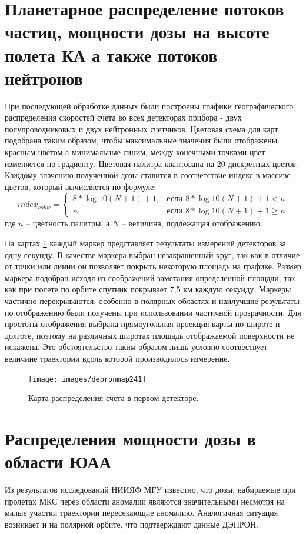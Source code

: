 \section{Планетарное распределение потоков частиц, мощности дозы на высоте полета КА а также потоков нейтронов} \label{sec:planetDose}
При последующей обработке данных были построены графики географического распределения скоростей счета во всех детекторах прибора - двух полупроводниковых и двух нейтронных счетчиков. Цветовая схема для карт подобрана таким образом, чтобы максимальные значения были отображены красным цветом а минимальные синим, между конечными точками цвет изменяется по градиенту. Цветовая палитра квантована на 20 дискретных цветов. Каждому значению полученной дозы ставится в соответствие индекс в массиве цветов, который вычисляется по формуле:
\begin{equation*}
index_{color} = \begin{cases}
	8*\log{10}(N + 1)+1,  & \text{если } 8*\log{10}(N + 1) +1 < n \\
	n,  & \text{если } 8*\log{10}(N + 1) +1 \ge n
	\end{cases}
\end{equation*}
		где $ n $ -- цветность палитры, а $ N $ -- величина, подлежащая отображению.
						
%
На картах 	\ref{fig:depronmap241} каждый маркер представляет результаты измерений детекторов за одну секунду. В качестве маркера выбран незакрашенный круг, так как в отличие от точки или линии он позволяет покрыть некоторую площадь на графике. Размер маркера подобран исходя из соображений заметания определенной площади, так как  при полете по орбите спутник покрывает 7,5 км каждую секунду. Маркеры частично перекрываются, особенно в полярных областях и наилучшие результаты по отображению были получены при использовании частичной прозрачности. Для простоты отображения выбрана прямоугольная проекция карты по широте и долготе, поэтому на различных широтах площадь отображаемой поверхности не искажена. Это обстоятельство таким образом лишь условно соотвествует величине траектории вдоль которой производилось измерение.
\begin{figure}[h]
	\centering
	\texttt{[image: images/depronmap241]}
	\caption{Карта распределения счета в первом детекторе.}
	\label{fig:depronmap241}
\end{figure}

\section{Распределения мощности дозы в области ЮАА}
Из результатов исследований НИИЯФ МГУ \cite{Lishnevskii2012} известно, что дозы,  набираемые при пролетах МКС через области аномалии являются значительными несмотря на малые участки траектории пересекающие аномалию. Аналогичная ситуация возникает и на полярной орбите, что подтверждают данные ДЭПРОН. 

